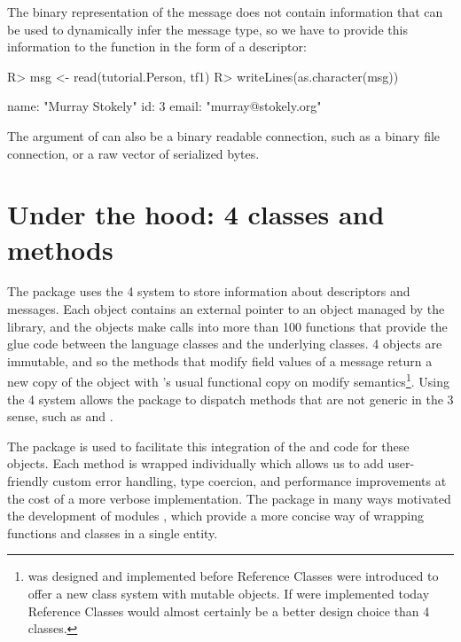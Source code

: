 \documentclass[article]{jss}
\begin{document}
The binary representation of the message
does not contain information that can be used to dynamically
infer the message type, so we have to provide this information
to the  function in the form of a descriptor:
%
\begin{Schunk}
\begin{Sinput}
R> msg <- read(tutorial.Person, tf1)
R> writeLines(as.character(msg))
\end{Sinput}
\begin{Soutput}
name: "Murray Stokely"
id: 3
email: "murray@stokely.org"
\end{Soutput}
\end{Schunk}
%
The  argument of  can also be a binary
readable  connection, such as a binary file connection, or a raw vector of serialized bytes.

\section[Under the hood: S4 classes and methods]{Under the hood: 4 classes and methods}
\label{sec:rprotobuf-classes}

The  package uses the 4 system to store
information about descriptors and messages.  Each  object
contains an external pointer to an object managed by the
  library, and the  objects
make calls into more than 100  functions that provide
the glue code between the  language classes and the
underlying  classes.  4 objects are
immutable, and so the methods that modify field values of a message
return a new copy of the object with 's usual functional
copy on modify semantics\footnote{ was designed and
  implemented before Reference Classes were introduced to offer a new
  class system with mutable objects.  If  were implemented
  today Reference Classes would almost certainly be a better design
  choice than 4 classes.}.  Using the 4 system
allows the package to dispatch methods that are not generic in the
3 sense, such as  and .

The  package
\citep{eddelbuettel2011rcpp,eddelbuettel2013seamless} is used to 
facilitate this integration of the  and  code for these objects.
Each method is wrapped individually which allows us to add 
user-friendly custom error handling, type coercion, and performance
improvements at the cost of a more verbose implementation.
The  package in many ways motivated
the development of  modules \citep{eddelbuettel2013exposing},
which provide a more concise way of wrapping  functions and classes
in a single entity.
\end{document}
